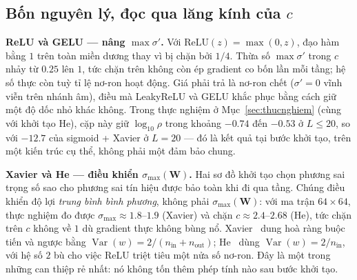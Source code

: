 \subsection{Bốn nguyên lý, đọc qua lăng kính của \texorpdfstring{$c$}{c}}

\textbf{ReLU và GELU --- nâng $\max\sigma'$.} Với $\mathrm{ReLU}(z)=\max(0,z)$,
đạo hàm bằng $1$ trên toàn miền dương thay vì bị chặn bởi $1/4$. Thừa số
$\max\sigma'$ trong $c$ nhảy từ $0.25$ lên $1$, tức chặn trên không còn ép
gradient co bốn lần mỗi tầng; hệ số thực còn tuỳ tỉ lệ nơ-ron hoạt động. Giá phải trả là nơ-ron chết ($\sigma'=0$ vĩnh viễn trên nhánh
âm), điều mà LeakyReLU và GELU khắc phục bằng cách giữ một độ dốc nhỏ khác không.
Trong thực nghiệm ở Mục~\ref{sec:thucnghiem} (cùng với khởi tạo He), cặp này
giữ $\log_{10}\rho$ trong khoảng $-0.74$ đến $-0.53$ ở $L\le20$, so với
$-12.7$ của sigmoid + Xavier ở $L=20$ --- đó là kết quả tại bước khởi tạo, trên
một kiến trúc cụ thể, không phải một đảm bảo chung.

\textbf{Xavier và He --- điều khiển $\sigma_{\max}(\mathbf{W})$.} Hai sơ đồ khởi
tạo chọn phương sai trọng số sao cho phương sai tín hiệu được bảo toàn khi đi qua
tầng. Chúng điều khiển độ lợi \emph{trung bình bình phương}, không phải
$\sigma_{\max}(\mathbf{W})$: với ma trận $64\times64$, thực nghiệm đo được
$\sigma_{\max}\approx1.8$--$1.9$ (Xavier) và chặn $c\approx2.4$--$2.68$ (He), tức chặn
trên $c$ không về $1$ dù gradient thực không bùng nổ. Xavier~\cite{GlorotBengio2010} dung hoà ràng buộc tiến và ngược bằng
$\operatorname{Var}(w)=2/(n_{\text{in}}+n_{\text{out}})$; He~\cite{He2015} dùng
$\operatorname{Var}(w)=2/n_{\text{in}}$, với hệ số $2$ bù cho việc ReLU triệt tiêu
một nửa số nơ-ron. Đây là một trong những can thiệp rẻ nhất: nó không tốn thêm phép tính nào
sau bước khởi tạo.

